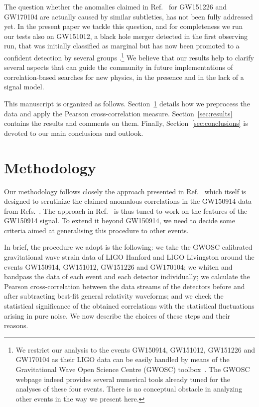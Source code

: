\documentclass[a4paper,11pt]{article}
\begin{document}
The question whether the anomalies claimed in Ref.~\cite{Creswell:2017rbh} for GW151226 and GW170104 are actually caused by similar subtleties, has not been fully addressed yet. In the present paper we tackle this question, and  for completeness we run our tests also on GW151012, a black hole merger detected in the first observing run, that was initially classified as marginal but has now been promoted to a confident detection by several groups \cite{Nitz:2018imz, LIGOScientific:2018mvr, Venumadhav:2019tad}.\footnote{We restrict our analysis to the events GW150914, GW151012, GW151226 and GW170104  as their LIGO data can be easily handled by means of the Gravitational Wave Open Science Centre (GWOSC) toolbox~\cite{Vallisneri:2014vxa}. The GWOSC  webpage indeed provides several numerical tools already tuned for the analyses of these four events.
There is no conceptual obstacle in analyzing other events in the way we present here.}
%
We believe that our results help to clarify several aspects that can guide the community in future implementations of  correlation-based searches for new physics, in the presence and in the lack of a signal model.  



This  manuscript  is  organized  as  follows.   Section~\ref{sec:int_meth} details how we preprocess the data and apply the Pearson cross-correlation measure. Section~\ref{sec:results} contains the results and comments on them.  Finally, Section~\ref{sec:conclusions} is devoted to our main conclusions and outlook.


\section{Methodology}
\label{sec:int_meth}


Our methodology follows closely the approach presented in Ref.~\cite{Nielsen:2018bhc} which itself is designed to scrutinize the claimed anomalous correlations in the GW150914 data from Refs.~\cite{Liu:2016kib, Creswell:2017rbh}. 
The approach in Ref.~\cite{Nielsen:2018bhc} is thus tuned to work on the features of the GW150914 signal. To extend it beyond GW150914, we need to decide some criteria aimed at generalising this procedure to other events.

In brief, the procedure we adopt is the following: we take the GWOSC calibrated gravitational wave strain data of LIGO Hanford and LIGO Livingston around the events GW150914, GW151012, GW151226 and GW170104; we whiten and bandpass the data of each event and each detector individually; we calculate the Pearson cross-correlation between the data streams of the detectors before and after subtracting best-fit general relativity waveforms; and we check the statistical significance of the obtained correlations with the statistical fluctuations  arising in pure noise. We now describe the choices of these steps and their reasons.
%
\end{document}
